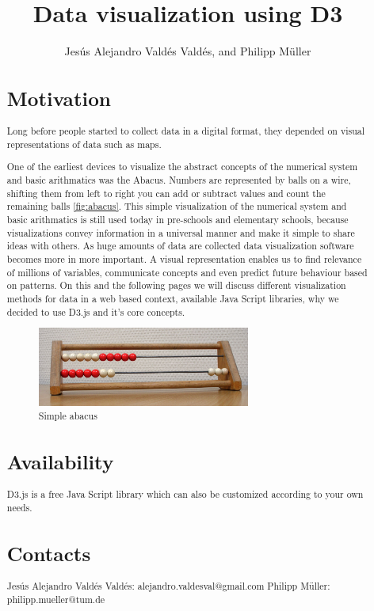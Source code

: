 \documentclass{bioinfo}
\begin{document}

\title[short Title]{Data visualization using D3}
\author[Data visualization using D3]{Jes\'us Alejandro Vald\'es Vald\'es, and Philipp M\"uller}
\address{}
\history{}
\editor{}

\maketitle

\begin{abstract}
\section{Motivation}
\hfill \break
Long before people started to collect data in a digital format, they depended on visual representations of data such as maps.

One of the earliest devices to visualize the abstract concepts of the numerical system and basic arithmatics was the Abacus. %
Numbers are represented by balls on a wire, shifting them from left to right you can add or subtract values and count the remaining balls \ref{fig:abacus}.
This simple visualization of the numerical system and basic arithmatics is still used today in pre-schools and elementary schools, because visualizations convey information in a universal manner and make it simple to share ideas with others.
\newline
As huge amounts of data are collected data visualization software becomes more in more important. A visual representation enables us to find relevance of millions of variables, communicate concepts and even predict future behaviour based on patterns.
\newline
On this and the following pages we will discuss different visualization methods for data in a web based context, available Java Script libraries, why we decided to use D3.js and it's core concepts.
\begin{figure}[!tpb]
\centerline{\includegraphics[width=70mm]{abacus.jpg}}
\caption{Simple abacus}\label{fig:abacus}
\end{figure}

\section{Availability}
\hfill \break
D3.js is a free Java Script library which can also be customized according to your own needs.

\section{Contacts}
\hfill \break
Jes\'us Alejandro Vald\'es Vald\'es: alejandro.valdesval@gmail.com \newline
Philipp M\"uller: philipp.mueller@tum.de
\end{abstract}
\end{document}

